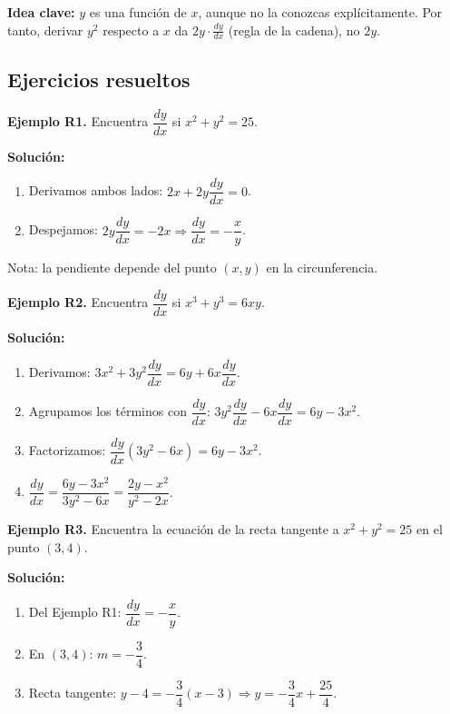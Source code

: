\documentclass[12pt, a4paper]{article}
\begin{document}
\begin{cuadroadvertencia}
  \textbf{Idea clave:} $y$ es una función de $x$, aunque no la conozcas explícitamente. Por tanto, derivar $y^2$ respecto a $x$ da $2y \cdot \frac{dy}{dx}$ (regla de la cadena), no $2y$.
\end{cuadroadvertencia}

\subsection{Ejercicios resueltos}

\textbf{Ejemplo R1.} Encuentra $\dfrac{dy}{dx}$ si $x^2 + y^2 = 25$.

\begin{cuadrosolucion}
  \textbf{Solución:}
  \begin{enumerate}
    \item Derivamos ambos lados: $2x + 2y\dfrac{dy}{dx} = 0$.
    \item Despejamos: $2y\dfrac{dy}{dx} = -2x \Rightarrow \dfrac{dy}{dx} = -\dfrac{x}{y}$.
  \end{enumerate}
  Nota: la pendiente depende del punto $(x, y)$ en la circunferencia.
\end{cuadrosolucion}

\newpage

\textbf{Ejemplo R2.} Encuentra $\dfrac{dy}{dx}$ si $x^3 + y^3 = 6xy$.

\begin{cuadrosolucion}
  \textbf{Solución:}
  \begin{enumerate}
    \item Derivamos: $3x^2 + 3y^2 \dfrac{dy}{dx} = 6y + 6x\dfrac{dy}{dx}$.
    \item Agrupamos los términos con $\dfrac{dy}{dx}$: $3y^2 \dfrac{dy}{dx} - 6x\dfrac{dy}{dx} = 6y - 3x^2$.
    \item Factorizamos: $\dfrac{dy}{dx}(3y^2 - 6x) = 6y - 3x^2$.
    \item $\dfrac{dy}{dx} = \dfrac{6y - 3x^2}{3y^2 - 6x} = \dfrac{2y - x^2}{y^2 - 2x}$.
  \end{enumerate}
\end{cuadrosolucion}

\textbf{Ejemplo R3.} Encuentra la ecuación de la recta tangente a $x^2 + y^2 = 25$ en el punto $(3, 4)$.

\begin{cuadrosolucion}
  \textbf{Solución:}
  \begin{enumerate}
    \item Del Ejemplo R1: $\dfrac{dy}{dx} = -\dfrac{x}{y}$.
    \item En $(3, 4)$: $m = -\dfrac{3}{4}$.
    \item Recta tangente: $y - 4 = -\dfrac{3}{4}(x - 3) \Rightarrow y = -\dfrac{3}{4}x + \dfrac{25}{4}$.
  \end{enumerate}
\end{cuadrosolucion}
\end{document}
